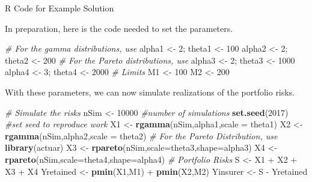 \documentclass[]{book}
\newenvironment{Shaded}{\begin{snugshade}}{\end{snugshade}}
\newcommand{\KeywordTok}[1]{\textcolor[rgb]{0.13,0.29,0.53}{\textbf{{#1}}}}
\newcommand{\DataTypeTok}[1]{\textcolor[rgb]{0.13,0.29,0.53}{{#1}}}
\newcommand{\DecValTok}[1]{\textcolor[rgb]{0.00,0.00,0.81}{{#1}}}
\newcommand{\StringTok}[1]{\textcolor[rgb]{0.31,0.60,0.02}{{#1}}}
\newcommand{\CommentTok}[1]{\textcolor[rgb]{0.56,0.35,0.01}{\textit{{#1}}}}
\newcommand{\NormalTok}[1]{{#1}}
\theoremstyle{definition}
\theoremstyle{definition}
\theoremstyle{definition}
\theoremstyle{remark}
\begin{document}
R Code for Example Solution

\hypertarget{togglePortMgtExample}{}
In preparation, here is the code needed to set the parameters.

\begin{Shaded}
\begin{Highlighting}[]
\CommentTok{# For the gamma distributions, use}
\NormalTok{alpha1 <-}\StringTok{ }\DecValTok{2}\NormalTok{;      theta1 <-}\StringTok{ }\DecValTok{100}
\NormalTok{alpha2 <-}\StringTok{ }\DecValTok{2}\NormalTok{;      theta2 <-}\StringTok{ }\DecValTok{200}
\CommentTok{# For the Pareto distributions, use}
\NormalTok{alpha3 <-}\StringTok{ }\DecValTok{2}\NormalTok{;      theta3 <-}\StringTok{ }\DecValTok{1000}
\NormalTok{alpha4 <-}\StringTok{ }\DecValTok{3}\NormalTok{;      theta4 <-}\StringTok{ }\DecValTok{2000}
\CommentTok{# Limits}
\NormalTok{M1     <-}\StringTok{ }\DecValTok{100}
\NormalTok{M2     <-}\StringTok{ }\DecValTok{200}
\end{Highlighting}
\end{Shaded}

With these parameters, we can now simulate realizations of the portfolio
risks.

\begin{Shaded}
\begin{Highlighting}[]
\CommentTok{# Simulate the risks}
\NormalTok{nSim <-}\StringTok{ }\DecValTok{10000}  \CommentTok{#number of simulations}
\KeywordTok{set.seed}\NormalTok{(}\DecValTok{2017}\NormalTok{) }\CommentTok{#set seed to reproduce work }
\NormalTok{X1 <-}\StringTok{ }\KeywordTok{rgamma}\NormalTok{(nSim,alpha1,}\DataTypeTok{scale =} \NormalTok{theta1)  }
\NormalTok{X2 <-}\StringTok{ }\KeywordTok{rgamma}\NormalTok{(nSim,alpha2,}\DataTypeTok{scale =} \NormalTok{theta2)  }
\CommentTok{# For the Pareto Distribution, use}
\KeywordTok{library}\NormalTok{(actuar)}
\NormalTok{X3 <-}\StringTok{ }\KeywordTok{rpareto}\NormalTok{(nSim,}\DataTypeTok{scale=}\NormalTok{theta3,}\DataTypeTok{shape=}\NormalTok{alpha3)}
\NormalTok{X4 <-}\StringTok{ }\KeywordTok{rpareto}\NormalTok{(nSim,}\DataTypeTok{scale=}\NormalTok{theta4,}\DataTypeTok{shape=}\NormalTok{alpha4)}
\CommentTok{# Portfolio Risks}
\NormalTok{S         <-}\StringTok{ }\NormalTok{X1 +}\StringTok{ }\NormalTok{X2 +}\StringTok{ }\NormalTok{X3 +}\StringTok{ }\NormalTok{X4}
\NormalTok{Yretained <-}\StringTok{ }\KeywordTok{pmin}\NormalTok{(X1,M1) +}\StringTok{ }\KeywordTok{pmin}\NormalTok{(X2,M2)}
\NormalTok{Yinsurer  <-}\StringTok{ }\NormalTok{S -}\StringTok{ }\NormalTok{Yretained}
\end{Highlighting}
\end{Shaded}
\end{document}
